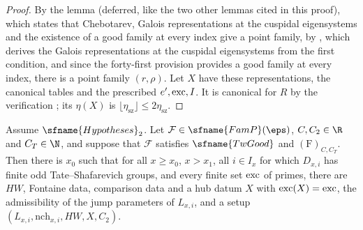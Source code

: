 \begin{proof}
By the lemma  (deferred, like the two other lemmas cited in this proof), which states that Chebotarev, Galois representations at the
cuspidal eigensystems and the existence of a good family at every index give a point family, by
, which derives the Galois representations at the cuspidal eigensystems from the first
condition, and since the forty-first provision provides a good family at every index, there is a point family $(r,\rho)$.
Let $X$ have these representations, the canonical tables and the prescribed $e',\mathrm{exc},I$. It is canonical for $R$ by the
verification ; its $\eta(X)$ is $\lfloor\eta_{\mathrm{sz}}\rfloor\le2\eta_{\mathrm{sz}}$.
\end{proof}

\begin{proposition}\label{pf:linkN-sel:setup}
Assume $\sfname{Hypotheses}_2$. Let $\mathcal F\in\sfname{FamP}(\eps)$, $C,C_2\in\R$ and $C_T\in\N$, and suppose that $\mathcal F$ satisfies
$\sfname{TwGood}$ and $(\mathrm F)_{C,C_T}$. Then there is $x_0$ such that for all $x\ge x_0$, $x>x_1$, all $i\in I_x$ for which $D_{x,i}$
has finite odd Tate--Shafarevich groups, and every finite set $\mathrm{exc}$ of primes, there are $HW$, Fontaine data, comparison data and
a hub datum $X$ with $\mathrm{exc}(X)=\mathrm{exc}$, the admissibility of the jump parameters of $L_{x,i}$, and a setup
$(L_{x,i},\mathrm{nch}_{x,i},HW,X,C_2)$.
\end{proposition}

